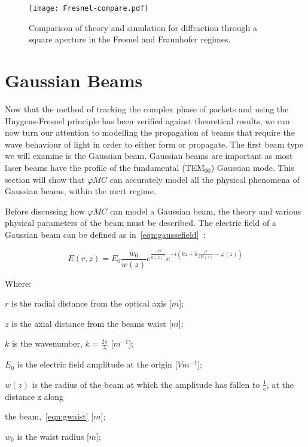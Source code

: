 \begin{figure}[!ht]
    \centering
    \texttt{[image: Fresnel-compare.pdf]}
    \caption{Comparison of theory and simulation for diffraction through a square aperture in the Fresnel and Fraunhofer regimes.}
    \label{fig:frescompare}
\end{figure}

\FloatBarrier
\newpage
\section{Gaussian Beams}

Now that the method of tracking the complex phase of packets and using the Huygens-Fresnel principle has been verified against theoretical results, we can now turn our attention to modelling the propagation of beams that require the wave behaviour of light in order to either form or propagate.
The first beam type we will examine is the Gaussian beam.
Gaussian beams are important as most laser beams have the profile of the fundamental (TEM$_{00}$) Gaussian mode.
This section will show that $\varphi MC$ can accurately model all the physical phenomena of Gaussian beams, within the \gls*{mcrt} regime.

Before discussing how $\varphi MC$ can model a Gaussian beam, the theory and various physical parameters of the beam must be described. 
The electric field of a Gaussian beam can be defined as in~\cref{eqn:gaussefield}~\cite{milonni2010laser}:

\begin{equation}
E(r,z)=E_0\frac{w_0}{w(z)}e^{\frac{-r^2}{w(z)^2}}e^{-i(kz+k\frac{r^2}{2R(z)}-\varphi(z))}
\label{eqn:gaussefield}
\end{equation}

\noindent Where:

    \indent $r$ is the radial distance from the optical axis [$m$];

    \indent $z$ is the axial distance from  the beams waist [$m$];

    \indent $k$ is the wavenumber, $k=\frac{2\pi}{\lambda}$ [$m^{-1}$];

    \indent $E_0$ is the electric field amplitude at the origin [$Vm^{-1}$];

    \indent $w(z)$ is the radius of the beam at which the amplitude has fallen to $\frac{1}{e}$, at the distance z along 

    \indent the beam,~\cref{eqn:gwaist} [$m$];

    \indent $w_0$ is the waist radius [$m$];

